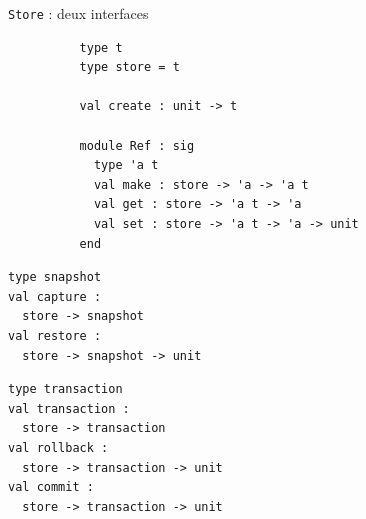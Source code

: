 \documentclass[usenames,dvipsnames]{beamer}
\begin{document}


\begin{frame}[fragile]{\texttt{Store} : deux interfaces}
\centering
\footnotesize
\begin{verbatim}
          type t
          type store = t
          
          val create : unit -> t
          
          module Ref : sig
            type 'a t
            val make : store -> 'a -> 'a t
            val get : store -> 'a t -> 'a
            val set : store -> 'a t -> 'a -> unit
          end
\end{verbatim}
\vfill
\begin{minipage}[t]{.49\textwidth}
\begin{verbatim}
type snapshot
val capture :
  store -> snapshot
val restore :
  store -> snapshot -> unit
\end{verbatim}
\end{minipage}
\hfill
\begin{minipage}[t]{.49\textwidth}
\begin{verbatim}
type transaction
val transaction :
  store -> transaction
val rollback :
  store -> transaction -> unit
val commit :
  store -> transaction -> unit
\end{verbatim}
\end{minipage}
\end{frame}
\end{document}
